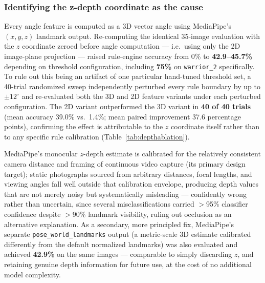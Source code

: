 \documentclass[conference]{IEEEtran}
\begin{document}
\subsubsection{Identifying the z-depth coordinate as the cause}
Every angle feature is computed as a 3D vector angle using MediaPipe's
$(x, y, z)$ landmark output. Re-computing the identical 35-image evaluation with the
$z$ coordinate zeroed before angle computation --- i.e.\ using only the 2D image-plane
projection --- raised rule-engine accuracy from 0\% to \textbf{42.9--45.7\%} depending
on threshold configuration, including \textbf{75\%} on \texttt{warrior\_2} specifically.
To rule out this being an artifact of one particular hand-tuned threshold set, a
40-trial randomized sweep independently perturbed every rule boundary by up to
$\pm12^{\circ}$ and re-evaluated both the 3D and 2D feature variants under each
perturbed configuration. The 2D variant outperformed the 3D variant in
\textbf{40 of 40 trials} (mean accuracy 39.0\% vs.\ 1.4\%; mean paired improvement
37.6 percentage points), confirming the effect is attributable to the $z$ coordinate
itself rather than to any specific rule calibration (Table~\ref{tab:depthablation}).

MediaPipe's monocular $z$-depth estimate is calibrated for the relatively consistent
camera distance and framing of continuous video capture (its primary design target);
static photographs sourced from arbitrary distances, focal lengths, and viewing angles
fall well outside that calibration envelope, producing depth values that are not
merely noisy but systematically misleading --- confidently wrong rather than
uncertain, since several misclassifications carried $>$95\% classifier confidence
despite $>$90\% landmark visibility, ruling out occlusion as an alternative
explanation. As a secondary, more principled fix, MediaPipe's separate
\texttt{pose\_world\_landmarks} output (a metric-scale 3D estimate calibrated
differently from the default normalized landmarks) was also evaluated and achieved
\textbf{42.9\%} on the same images --- comparable to simply discarding $z$, and
retaining genuine depth information for future use, at the cost of no additional
model complexity.
\end{document}
